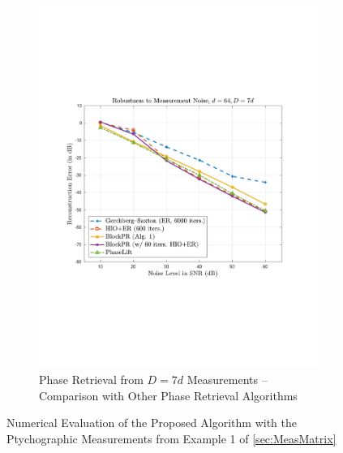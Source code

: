 \begin{figure}[hbtp]
\begin{subfigure}[b]{0.8\textwidth}
\includegraphics[clip=true, trim = 0.75in 2.75in 1in 2.5in,scale=0.6]{pics/robustness600_Fourier}
\caption{Phase Retrieval from $D=7d$ Measurements -- Comparison with Other Phase Retrieval Algorithms}
\label{fig:noise_robust_ptych}
\end{subfigure}
\caption{Numerical Evaluation of the Proposed Algorithm with the Ptychographic Measurements from
    Example 1 of \cref{sec:MeasMatrix}}
\label{fig:ptych_meas}
\end{figure}
%
